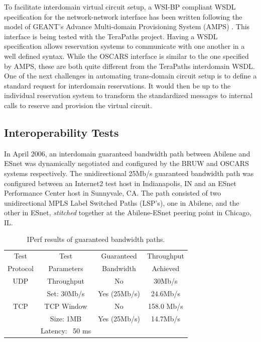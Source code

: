\documentclass[conference]{IEEEtran}
\begin{document}
To facilitate interdomain virtual circuit setup, a WSI-BP \cite{ballinger}
compliant WSDL specification for the 
network-network interface has been written following the model of 
GEANT's Advance Multi-domain Provisioning
System (AMPS)  \cite{geant-amps} . This interface is being tested with the 
TeraPaths \cite{TeraPaths} project. 
Having a WSDL specification allows reservation systems to communicate with one 
another in a well defined 
syntax. While the OSCARS interface is similar to the one specified by AMPS, these
are both quite different from the TeraPaths interdomain WSDL.
One of the next challenges in
automating trans-domain circuit setup is to define a standard request for interdomain
reservations. It would then be up to the individual reservation system to 
transform the standardized messages to internal calls to reserve and provision the 
virtual circuit.

 \subsection{Interoperability Tests}

In April 2006, an interdomain guaranteed bandwidth path between Abilene and 
ESnet was dynamically negotiated and configured by the BRUW and OSCARS systems 
respectively. The unidirectional 25Mb/s guaranteed bandwidth path was 
configured between an Internet2 test host in Indianapolis, IN and an ESnet 
Performance Center \cite{esnet-pc} host in Sunnyvale, CA.  The path consisted of two 
unidirectional MPLS Label Switched Paths (LSP's), one in Abilene, and the 
other in ESnet, \emph{stitched} together at the Abilene-ESnet peering point in 
Chicago, IL.

\begin{table}
 \centering
 {\scriptsize
 \begin{tabular}{|c|c|c|c|}
 \hline
 Test     & Test       & Guaranteed & Throughput  \\ 
 Protocol & Parameters & Bandwidth  & Achieved    \\ \hline \hline 
 UDP      & Throughput  & No         &   30Mb/s   \\ \cline{3-4}
          & Set: 30Mb/s& Yes (25Mb/s)&   24.6Mb/s \\ \hline
 TCP      & TCP Window & No         & 158.0 Mb/s  \\ \cline{3-4}
          & Size: 1MB  & Yes (25Mb/s)&  14.7Mb/s  \\ 
          & Latency: ~50 ms &          &            \\  \hline
 \end{tabular}
 }
 \caption{IPerf results of guaranteed bandwidth paths.}
 \label{tab:bandwidth}
\end{table}
\end{document}
